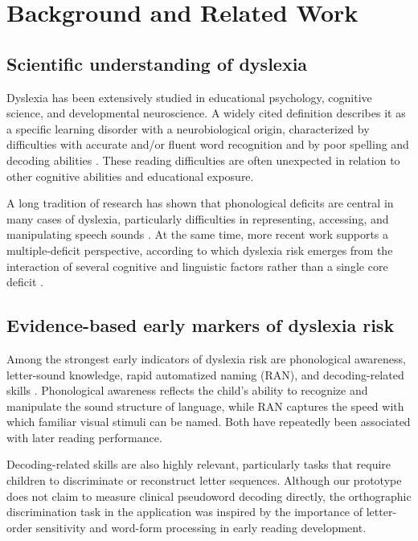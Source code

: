 \documentclass[conference]{IEEEtran}
\begin{document}
\section{Background and Related Work}

\subsection{Scientific understanding of dyslexia}

Dyslexia has been extensively studied in educational psychology, cognitive science, and developmental neuroscience. A widely cited definition describes it as a specific learning disorder with a neurobiological origin, characterized by difficulties with accurate and/or fluent word recognition and by poor spelling and decoding abilities \cite{lyon2003}. These reading difficulties are often unexpected in relation to other cognitive abilities and educational exposure.

A long tradition of research has shown that phonological deficits are central in many cases of dyslexia, particularly difficulties in representing, accessing, and manipulating speech sounds \cite{snowling2000,vellutino2004}. At the same time, more recent work supports a multiple-deficit perspective, according to which dyslexia risk emerges from the interaction of several cognitive and linguistic factors rather than a single core deficit \cite{pennington2006}.

\subsection{Evidence-based early markers of dyslexia risk}

Among the strongest early indicators of dyslexia risk are phonological awareness, letter-sound knowledge, rapid automatized naming (RAN), and decoding-related skills \cite{catts2015,puolakanaho2007}. Phonological awareness reflects the child's ability to recognize and manipulate the sound structure of language, while RAN captures the speed with which familiar visual stimuli can be named. Both have repeatedly been associated with later reading performance.

Decoding-related skills are also highly relevant, particularly tasks that require children to discriminate or reconstruct letter sequences. Although our prototype does not claim to measure clinical pseudoword decoding directly, the orthographic discrimination task in the application was inspired by the importance of letter-order sensitivity and word-form processing in early reading development.
\end{document}
